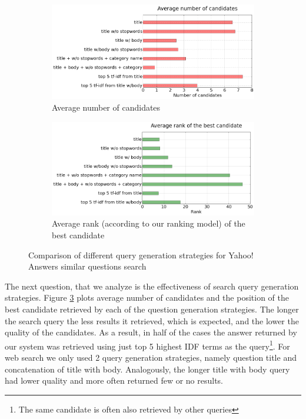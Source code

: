 \documentclass[]{article}
\begin{document}
\begin{figure}
\centering
	\begin{subfigure}[b]{0.45\textwidth}
	\includegraphics[width=\textwidth]{img/query_candidate_count}
	\caption{Average number of candidates}
	\label{figure:analysis:query_generation:count}
	\end{subfigure}
	\begin{subfigure}[b]{0.45\textwidth}
	\includegraphics[width=\textwidth]{img/query_candidate_bestrank}
	\caption{Average rank (according to our ranking model) of the best candidate}
	\label{figure:analysis:query_generation:rank}
	\end{subfigure}
	\caption{Comparison of different query generation strategies for Yahoo! Answers similar questions search}
	\label{figure:analysis:query_generation}
\end{figure}

The next question, that we analyze is the effectiveness of search query generation strategies.
Figure \ref{figure:analysis:query_generation} plots average number of candidates and the position of the best candidate retrieved by each of the question generation strategies.
The longer the search query the less results it retrieved, which is expected, and the lower the quality of the candidates.
As a result, in half of the cases the answer returned by our system was retrieved using just top 5 highest IDF terms as the query\footnote{The same candidate is often also retrieved by other queries}.
For web search we only used 2 query generation strategies, namely question title and concatenation of title with body.
Analogously, the longer title with body query had lower quality and more often returned few or no results.
\end{document}
